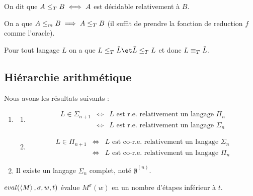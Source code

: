 \begin{definition}
	On dit que $A \leq_T B \iff A$ est décidable relativement à $B$.
\end{definition}

\begin{remarque}
	On a que $A \leq_m B \implies A \leq_T B$ (il suffit de prendre la fonction de reduction $f$ comme l'oracle).
\end{remarque}

\begin{remarque}
	Pour tout langage $L$ on a que $L \leqt \bar L \et \bar L \leqt L$ et donc $L \equiv_T \bar L$.
\end{remarque}


\subsection{Hiérarchie arithmétique}

\begin{theorem}[de Post]
	Nous avons les résultats suivants :
	\begin{enumerate}
		\item \label{thm:post-1}
		      \begin{enumerate}
			      \item \label{thm:post-1a}
			            \begin{eqnarray*}
				            L \in \Sigma_{n+1} &\iff& L \text{ est r.e. relativement  un langage }  \Pi_n  \\
				            &\iff& L \text{ est r.e. relativement  un langage }  \Sigma_{n}
			            \end{eqnarray*}

			      \item
			            \begin{eqnarray*}
				            L \in \Pi_{n+1} &\iff& L \text{ est co-r.e. relativement  un langage }  \Sigma_n  \\
				            &\iff& L \text{ est co-r.e. relativement  un langage }  \Pi_n
			            \end{eqnarray*}
		      \end{enumerate}

		\item Il existe un langage $\Sigma_n$ complet, noté $\emptyset^{(n)}$. \label{thm:post-2}
	\end{enumerate}
\end{theorem}


\begin{definition}
	$eval(\left\langle M\right\rangle, \sigma,w,t)$ évalue $M^{\sigma}(w)$ en un nombre d'étapes inférieur à $t$.
\end{definition}

